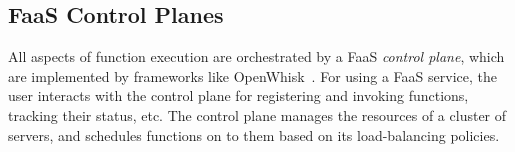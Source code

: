 



\subsection{FaaS Control Planes}
\label{sec:bg:cplane}

All aspects of function execution are orchestrated by a FaaS \emph{control plane}, which are implemented by frameworks like OpenWhisk~\cite{openwhisk}.
For using a FaaS service, the user interacts with the control plane for registering and invoking functions, tracking their status, etc.
The control plane manages the resources of a cluster of servers, and schedules functions on to them based on its load-balancing policies.


